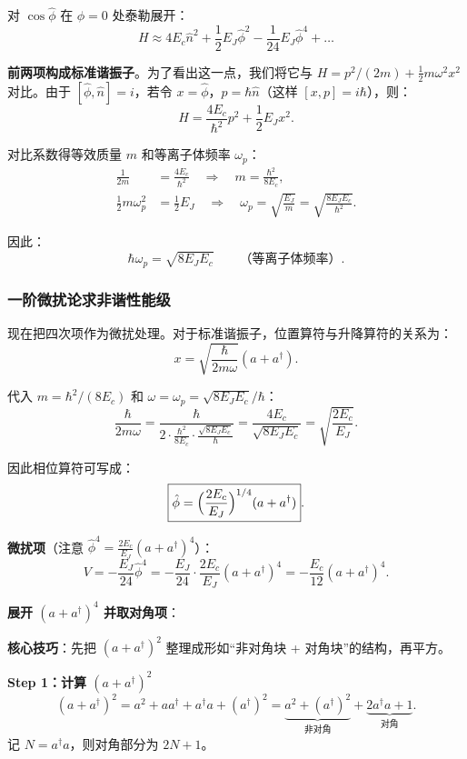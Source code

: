 对 $\cos\hat{\phi}$ 在 $\phi=0$ 处泰勒展开：
\[
H \approx 4E_c \hat{n}^2 + \frac{1}{2} E_J \hat{\phi}^2 - \frac{1}{24} E_J \hat{\phi}^4 + \dots
\]

\textbf{前两项构成标准谐振子}。为了看出这一点，我们将它与 $H = p^2/(2m) + \frac{1}{2}m\omega^2 x^2$ 对比。由于 $[\hat{\phi}, \hat{n}] = i$，若令 $x = \hat{\phi}$，$p = \hbar\hat{n}$（这样 $[x,p] = i\hbar$），则：
\[
H = \frac{4E_c}{\hbar^2} p^2 + \frac{1}{2} E_J x^2.
\]

对比系数得等效质量 $m$ 和等离子体频率 $\omega_p$：
\begin{align*}
\frac{1}{2m} &= \frac{4E_c}{\hbar^2} \quad \Rightarrow \quad m = \frac{\hbar^2}{8E_c}, \\[4pt]
\frac{1}{2}m\omega_p^2 &= \frac{1}{2}E_J \quad \Rightarrow \quad \omega_p = \sqrt{\frac{E_J}{m}} = \sqrt{\frac{8E_J E_c}{\hbar^2}}.
\end{align*}

因此：
\[
\boxed{\hbar\omega_p = \sqrt{8E_J E_c}} \qquad \text{（等离子体频率）}.
\]

\subsubsection{一阶微扰论求非谐性能级}

现在把四次项作为微扰处理。对于标准谐振子，位置算符与升降算符的关系为：
\[
x = \sqrt{\frac{\hbar}{2m\omega}}(a + a^\dagger).
\]

代入 $m = \hbar^2/(8E_c)$ 和 $\omega = \omega_p = \sqrt{8E_J E_c}/\hbar$：
\[
\frac{\hbar}{2m\omega} = \frac{\hbar}{2 \cdot \frac{\hbar^2}{8E_c} \cdot \frac{\sqrt{8E_J E_c}}{\hbar}} = \frac{4E_c}{\sqrt{8E_J E_c}} = \sqrt{\frac{2E_c}{E_J}}.
\]

因此相位算符可写成：
\[
\boxed{\hat{\phi} = \Bigl(\frac{2E_c}{E_J}\Bigr)^{1/4} (a + a^\dagger)}.
\]

\textbf{微扰项}（注意 $\hat{\phi}^4 = \frac{2E_c}{E_J}(a+a^\dagger)^4$）：
\[
V = -\frac{E_J}{24}\hat{\phi}^4 = -\frac{E_J}{24} \cdot \frac{2E_c}{E_J} (a+a^\dagger)^4 = -\frac{E_c}{12}(a+a^\dagger)^4.
\]

\textbf{展开 $(a+a^\dagger)^4$ 并取对角项}：

\textbf{核心技巧}：先把 $(a+a^\dagger)^2$ 整理成形如``非对角块 + 对角块''的结构，再平方。

\textbf{Step 1：计算 $(a+a^\dagger)^2$}
\[
(a+a^\dagger)^2 = a^2 + aa^\dagger + a^\dagger a + (a^\dagger)^2 = \underbrace{a^2 + (a^\dagger)^2}_{\text{非对角}} + \underbrace{2a^\dagger a + 1}_{\text{对角}}.
\]
记 $N = a^\dagger a$，则对角部分为 $2N+1$。

